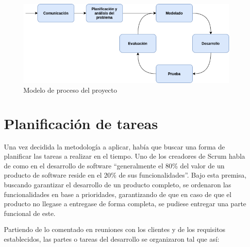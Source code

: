 \begin{figure}[H]
    \centering
    \includegraphics[width=\textwidth]{diseno/modelo_de_proceso.png}
    \caption{Modelo de proceso del proyecto}
    \label{fig:modelo_de_proceso}
\end{figure}

\section{Planificación de tareas}

Una vez decidida la metodología a aplicar, había que buscar una forma de planificar las tareas a realizar en el tiempo. Uno de los creadores de Scrum habla de como en el desarrollo de software ``generalmente el 80\% del valor de un producto de software reside en el 20\% de sus funcionalidades''\cite{sutherland-2014}. Bajo esta premisa, buscando garantizar el desarrollo de un producto completo, se ordenaron las funcionalidades en base a prioridades, garantizando de que en caso de que el producto no llegase a entregase de forma completa, se pudiese entregar una parte funcional de este.

Partiendo de lo comentado en reuniones con los clientes y de los requisitos establecidos, las partes o tareas del desarrollo se organizaron tal que así: 

